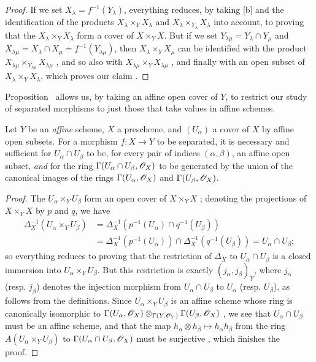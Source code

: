 \begin{proof}
If we set $X_\lambda=f^{-1}(Y_\lambda)$, everything reduces, by taking [b] and the identification of the products $X_\lambda\times_Y X_\lambda$ and $X_\lambda\times_{Y_\lambda}X_\lambda$ into account, to proving that the $X_\lambda\times_Y X_\lambda$ form a cover of $X\times_Y X$.
But if we set $Y_{\lambda\mu}=Y_\lambda\cap Y_\mu$ and $X_{\lambda\mu}=X_\lambda\cap X_\mu=f^{-1}(Y_{\lambda\mu})$, then $X_\lambda\times_Y X_\mu$ can be identified with the product $X_{\lambda\mu}\times_{Y_{\lambda\mu}}X_{\lambda\mu}$ , and so also with $X_{\lambda\mu}\times_Y X_{\lambda\mu}$ , and finally with an open subset of $X_\lambda\times_Y X_\lambda$, which proves our claim .
\end{proof}

Proposition~ allows us, by taking an affine open cover of $Y$, to restrict our study of separated morphisms to just those that take values in affine schemes.

\begin{proposition}[5.5.6]
\label{I.5.5.6}
Let $Y$ be an \emph{affine} scheme, $X$ a prescheme, and $(U_\alpha)$ a cover of $X$ by affine open subsets.
For a morphism $f:X\to Y$ to be separated, it is necessary and sufficient for $U_\alpha\cap U_\beta$ to be, for every pair of indices $(\alpha,\beta)$, an affine open subset, \emph{and} for the ring $\Gamma(U_\alpha\cap U_\beta,\mathscr{O}_X)$ to be generated by the union of the canonical images of the rings $\Gamma(U_\alpha,\mathscr{O}_X)$ and $\Gamma(U_\beta,\mathscr{O}_X)$.
\end{proposition}

\begin{proof}
The $U_\alpha\times_Y U_\beta$ form an open cover of $X\times_Y X$ ;
denoting the projections of $X\times_Y X$ by $p$ and $q$, we have
\begin{align*}
  \Delta_X^{-1}(U_\alpha\times_Y U_\beta)&=\Delta_X^{-1}(p^{-1}(U_\alpha)\cap q^{-1}(U_\beta))\\
                                         &=\Delta_X^{-1}(p^{-1}(U_\alpha))\cap\Delta_X^{-1}(q^{-1}(U_\beta))=U_\alpha\cap U_\beta;
\end{align*}
so everything reduces to proving that the restriction of $\Delta_X$ to $U_\alpha\cap U_\beta$ is a closed immersion into $U_\alpha\times_Y U_\beta$.
But this restriction is exactly $(j_\alpha,j_\beta)_Y$, where $j_\alpha$ (resp. $j_\beta$) denotes the injection morphism from $U_\alpha\cap U_\beta$ to $U_\alpha$ (resp. $U_\beta$), as follows from the definitions.
Since $U_\alpha\times_Y U_\beta$ is an affine scheme whose ring is canonically isomorphic to $\Gamma(U_\alpha,\mathscr{O}_X)\otimes_{\Gamma(Y,\mathscr{O}_Y)}\Gamma(U_\beta,\mathscr{O}_X)$ , we see that $U_\alpha\cap U_\beta$ must be an affine scheme, and that the map $h_\alpha\otimes h_\beta\mapsto h_\alpha h_\beta$ from the ring $A(U_\alpha\times_Y U_\beta)$ to $\Gamma(U_\alpha\cap U_\beta,\mathscr{O}_X)$ must be surjective , which finishes the proof.
\end{proof}


